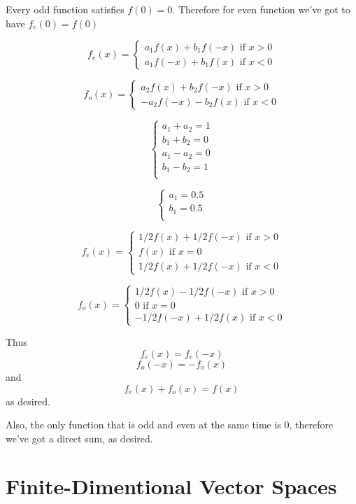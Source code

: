 \documentclass[11pt,oneside,titlepage]{book}
\begin{document}
Every odd function satisfies $f(0) = 0$.
Therefore for even function we've got to have $f_e(0) = f(0)$


$$
f_e(x) =
\begin{cases}
  a_1 f(x) + b_1 f(-x) \text{ if } x > 0 \\
  a_1 f(-x) + b_1 f(x) \text{ if } x < 0
\end{cases}
$$

$$
f_o(x) =
\begin{cases}
  a_2 f(x) + b_2 f(-x) \text{ if } x > 0 \\
  -a_2 f(-x) - b_2 f(x)  \text{ if } x < 0
\end{cases}
$$

$$
\begin{cases}
  a_1 + a_2 = 1 \\
  b_1 + b_2 = 0 \\
  a_1 - a_2 = 0 \\
  b_1 - b_2 = 1 \\
\end{cases}
$$

$$
\begin{cases}
  a_1  = 0.5 \\
  b_1 = 0.5 \\
\end{cases}
$$

$$
f_e(x) =
\begin{cases}
  1/2 f(x) + 1/2 f(-x) \text{ if } x > 0 \\
  f(x) \text{ if } x = 0 \\
  1/2 f(x) + 1/2 f(-x)  \text{ if } x < 0
\end{cases}
$$

$$
f_o(x) =
\begin{cases}
  1/2 f(x) - 1/2 f(-x) \text{ if } x > 0 \\
  0 \text{ if } x = 0 \\
  -1/2 f(-x) + 1/2 f(x)  \text{ if } x < 0
\end{cases}
$$

Thus
$$f_e(x) = f_e(-x)$$
$$f_o(-x) = -f_o(x)$$
and
$$f_e(x) + f_o(x) = f(x)$$
as desired.

Also, the only function that is odd and even at the same time is $0$,
therefore we've got a direct sum, as desired.


\chapter{Finite-Dimentional Vector Spaces}
\end{document}
